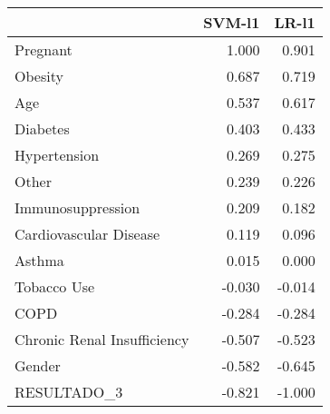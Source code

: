 \begin{tabular}{lrr}
\toprule
{} &  SVM-l1 &  LR-l1 \\
\midrule
Pregnant                    &   1.000 &  0.901 \\
Obesity                     &   0.687 &  0.719 \\
Age                         &   0.537 &  0.617 \\
Diabetes                    &   0.403 &  0.433 \\
Hypertension                &   0.269 &  0.275 \\
Other                       &   0.239 &  0.226 \\
Immunosuppression           &   0.209 &  0.182 \\
Cardiovascular Disease      &   0.119 &  0.096 \\
Asthma                      &   0.015 &  0.000 \\
Tobacco Use                 &  -0.030 & -0.014 \\
COPD                        &  -0.284 & -0.284 \\
Chronic Renal Insufficiency &  -0.507 & -0.523 \\
Gender                      &  -0.582 & -0.645 \\
RESULTADO\_3                 &  -0.821 & -1.000 \\
\bottomrule
\end{tabular}
